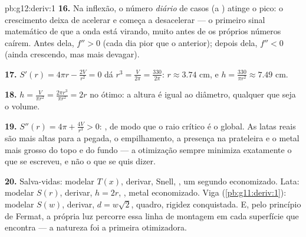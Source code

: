 \begin{solution}{pb:g12:deriv:1}
\textbf{16.} Na inflexão, o número \emph{diário} de casos (a
) atinge o pico: o crescimento deixa de acelerar e
começa a desacelerar --- o primeiro sinal matemático de que a
onda está virando, muito antes de os próprios números caírem.
Antes dela, $f'' > 0$ (cada dia pior que o anterior); depois
dela, $f'' < 0$ (ainda crescendo, mas mais devagar).

\textbf{17.} $S'(r) = 4\pi r - \frac{2V}{r^2} = 0$ dá
$r^3 = \frac{V}{2\pi} = \frac{330}{2\pi}$:
$r \approx 3.74$ cm, e
$h = \frac{330}{\pi r^2} \approx 7.49$ cm.

\textbf{18.} $h = \frac{V}{\pi r^2} = \frac{2\pi r^3}{\pi r^2}
= 2r$ no ótimo: a altura é igual ao diâmetro, qualquer que seja
o volume.

\textbf{19.} $S''(r) = 4\pi + \frac{4V}{r^3} > 0$: , de
modo que o raio crítico é o  global. As latas reais são
mais altas para a pegada, o empilhamento, a presença na
prateleira e o metal mais grosso do topo e do fundo --- a
otimização sempre minimiza exatamente o que se escreveu, e não
o que se quis dizer.

\textbf{20.} Salva-vidas: modelar $T(x)$, derivar, Snell,
, um segundo economizado. Lata: modelar $S(r)$,
derivar, $h = 2r$, , metal economizado. Viga
(\cref{pb:g11:deriv:1}): modelar $S(w)$, derivar,
$d = w\sqrt2$, quadro, rigidez conquistada. E, pelo princípio
de Fermat, a própria luz percorre essa linha de montagem em
cada superfície que encontra --- a natureza foi a primeira
otimizadora.
\end{solution}
